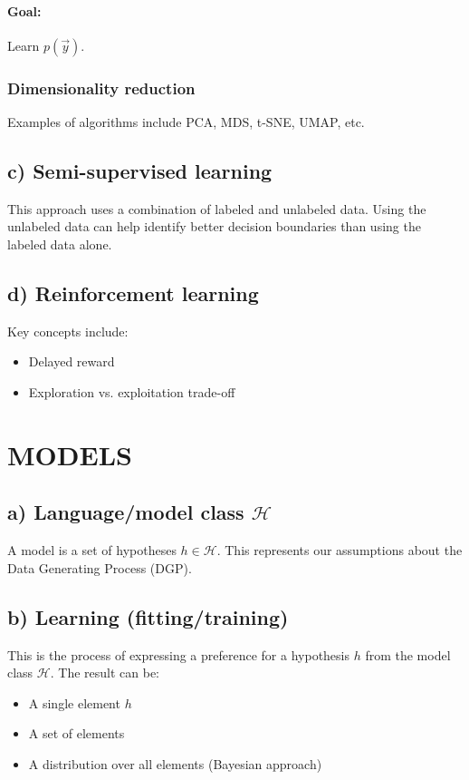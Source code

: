 \documentclass{article}
\begin{document}
\begin{multicols}{2}
\paragraph{Goal:} Learn $p(\vec{y})$.

\subsubsection{Dimensionality reduction}
Examples of algorithms include PCA, MDS, t-SNE, UMAP, etc. 

\subsection{c) Semi-supervised learning}
This approach uses a combination of labeled and unlabeled data.  Using the unlabeled data can help identify better decision boundaries than using the labeled data alone. 

\subsection{d) Reinforcement learning}
Key concepts include: 
\begin{itemize}
    \item Delayed reward 
    \item Exploration vs. exploitation trade-off 
\end{itemize}

\section{MODELS}

\subsection{a) Language/model class $\mathcal{H}$}
A model is a set of hypotheses $h \in \mathcal{H}$. This represents our assumptions about the Data Generating Process (DGP). 

\subsection{b) Learning (fitting/training)}
This is the process of expressing a preference for a hypothesis $h$ from the model class $\mathcal{H}$. The result can be: 
\begin{itemize}
    \item A single element $h$ 
    \item A set of elements 
    \item A distribution over all elements (Bayesian approach) 
\end{itemize}


\end{multicols}
\end{document}
